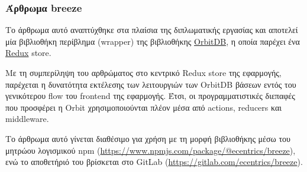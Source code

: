 \subsubsection{Άρθρωμα breeze} \label{subsubsection:4-3-1-eth-breeze-unit}

Το άρθρωμα αυτό αναπτύχθηκε στα πλαίσια της διπλωματικής εργασίας και αποτελεί μία βιβλιοθήκη περίβλημα (wrapper) της βιβλιοθήκης \hyperref[subsection:4-2-4-2-orbit-db]{OrbitDB}, η οποία παρέχει ένα \hyperref[subsection:4-2-2-2-redux]{Redux} store. 

Με τη συμπερίληψη του αρθρώματος στο κεντρικό Redux store της εφαρμογής, παρέχεται η δυνατότητα εκτέλεσης των λειτουργιών των OrbitDB βάσεων εντός του γενικότερου flow του frontend της εφαρμογής. Έτσι, οι προγραμματιστικές διεπαφές που προσφέρει η Orbit χρησιμοποιούνται πλέον μέσα από actions, reducers και middleware.

Το άρθρωμα αυτό γίνεται διαθέσιμο για χρήση με τη μορφή βιβλιοθήκης μέσω του μητρώου λογισμικού npm (\url{https://www.npmjs.com/package/@ecentrics/breeze}), ενώ το αποθετήριό του βρίσκεται στο GitLab (\url{https://gitlab.com/ecentrics/breeze}).
